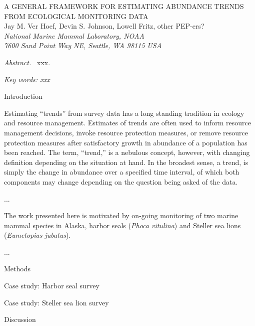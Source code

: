 \documentclass[12pt,letter]{report}
\begin{document}
\begin{center}
\Large A GENERAL FRAMEWORK FOR ESTIMATING ABUNDANCE TRENDS FROM ECOLOGICAL MONITORING DATA
\bigskip\\
\normalsize
{\sc Jay M. Ver Hoef\footnotemark[1], Devin S. Johnson, Lowell Fritz, other PEP-ers?}\smallskip\\
{\em National Marine Mammal Laboratory, NOAA\\
7600 Sand Point Way NE, Seattle,
WA 98115 USA }\\ \medskip
\end{center}

\raggedright \setlength{\parindent}{0.3in}
\renewcommand{\baselinestretch}{1.7}\normalsize
{}
 \linenumbers

{\em Abstract.\ } xxx.

{\em Key words: xxx}

\centerline{\sc Introduction}

Estimating ``trends'' from survey data has a long standing tradition in ecology and resource management. Estimates of trends are often used to inform resource management decisions, invoke resource protection measures, or remove resource protection measures after satisfactory growth in abundance of a population has been reached. The term, ``trend,'' is a nebulous concept, however, with changing definition depending on the situation at hand. In the broadest sense, a trend, is simply the change in abundance over a specified time interval, of which both components may change depending on the question being asked of the data.   

...

The work presented here is motivated by on-going monitoring of two marine mammal species in Alaska, harbor seals ({\it Phoca vitulina}) and Steller sea lions ({\it Eumetopias jubatus}).

...
   
\centerline{\sc Methods}

\centerline{\sc Case study: Harbor seal survey}

\centerline{\sc Case study: Steller sea lion survey}

\centerline{\sc Discussion}
\end{document}
